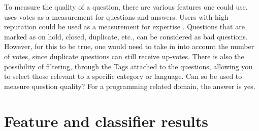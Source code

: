 To measure the quality of a question, there are various features one could use. 
\textcite{M.Sewak2010} uses votes as a measurement for questions and answers.
Users with high reputation could be used as a measurement for expertise \cite{Movshovitz-Attias2013}.
Questions that are marked as on hold, closed, duplicate, etc., can be considered as bad questions.
However, for this to be true, one would need to take in into account the number of votes, since duplicate questions can still receive up-votes.
There is also the possibility of filtering, through the Tags attached to the questions, allowing you to select those relevant to a specific category or language.
Can \gls{so} be used to measure question quality?
For a programming related domain, the answer is yes.

\begin{comment}
The same can be said for bad questions. 
In many cases, a question is bad not because of the question that is asked, but simply because it does not follow the guidelines. 
If a question is a duplicate, it is automatically voted for closure, and will in most cases receive multiple down-votes. 
Questions which gives a hint of being school related will also receive down-votes, mainly because \gls{so} targets professionals and experts. 
\gls{so} is neither a fan of unnecessary text like greetings and gratefulness \cite{CommunityWiki2016a,Heyer2012}.
Is \gls{so} fit for measuring question quality?
In a closed domain setting, the answer is yes. 
However, as mentioned, what type of quality being measured must be taken into consideration. 
As it is, the system would not be useful for an educational setting, because it bases its prediction on questions asked on \gls{so}.
If a student were to ask the system a question, it might respond saying that this is a bad question (but the result may be based on the fact that it is a duplicate).
For an educational setting, a better solution would be to develop a system similar to the one in \cite{Lezina2013}.
With the current state of the system (if it were to be used), it would be more appropriate to use it as a measurement tool for new \gls{so} questions, rather then general question quality.
\end{comment}

\section{Feature and classifier results}
\label{sec:feature_classifier_results}


